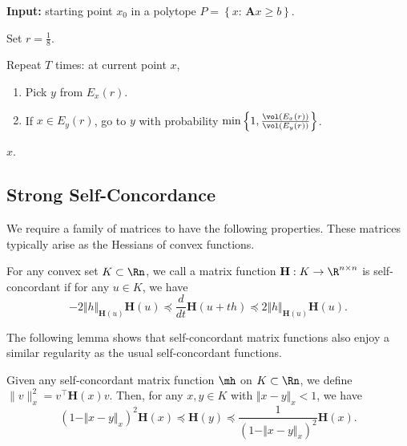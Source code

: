 \begin{algorithm2e}[H]\label{algo:Dikin}

\caption{$\mathtt{DikinWalk}$}

\SetAlgoLined

\textbf{Input:} starting point $x_{0}$ in a polytope $P=\left\{ x:\,\mathbf{A}x\ge b\right\} $.

Set $r=\frac{1}{8}$.

Repeat $T$ times: at current point $x$,
\begin{enumerate}
\item Pick $y$ from $E_{x}(r)$.
\item If $x\in E_{y}(r)$, go to $y$ with probability $\min\left\{ 1,\frac{\vol(E_{x}(r))}{\vol(E_{y}(r))}\right\} $.
\end{enumerate}
\Return $x$.

\end{algorithm2e}

\subsection{Strong Self-Concordance}

We require a family of matrices to have the following properties.
These matrices typically arise as the Hessians of convex functions.
\begin{defn}
For any convex set $K\subset\Rn$, we call a matrix function $\mathbf{H}:K\rightarrow\R^{n\times n}$
is self-concordant if for any $u\in K$, we have
\[
-2\Vert h\Vert_{\mathbf{H}(u)}\mathbf{H}(u)\preceq\frac{d}{dt}\mathbf{H}(u+th)\preceq2\Vert h\Vert_{\mathbf{H}(u)}\mathbf{H}(u).
\]
\end{defn}

The following lemma shows that self-concordant matrix functions also
enjoy a similar regularity as the usual self-concordant functions.
\begin{lem}
\label{lem:global_self_concordant}Given any self-concordant matrix
function $\mh$ on $K\subset\Rn$, we define $\|v\|_{x}^{2}=v^{\top}\mathbf{H}(x)v$.
Then, for any $x,y\in K$ with $\Vert x-y\Vert_{x}<1$, we have 
\[
\left(1-\Vert x-y\Vert_{x}\right)^{2}\mathbf{H}(x)\preceq\mathbf{H}(y)\preceq\frac{1}{\left(1-\Vert x-y\Vert_{x}\right)^{2}}\mathbf{H}(x).
\]
\end{lem}

